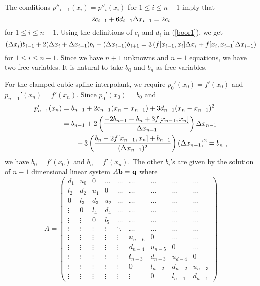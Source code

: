 The conditions $p''_{i-1}(x_i)= p''_i(x_i)$ for $1\leq i \leq n-1$
imply that
\[
2c_{i-1} + 6d_{i-1} \Delta{x_{i-1}} = 2 c_i
\]
for $1\leq i \leq n-1$.  Using the definitions of $c_i$ and $d_i$ in 
(\ref{boor1}), we get
\[
(\Delta{x_i}) b_{i-1}  + 2 (\Delta{x_i} + \Delta{x_{i-1}}) b_i
+ (\Delta{x_{i-1}}) b_{i+1} 
= 3 \left( f[x_{i-1},x_i] \Delta{x_i} + f[x_i,x_{i+1}] \Delta{x_{i-1}}
\right)
\]
for $1 \leq i \leq n-1$.  Since we have $n+1$ unknowns and $n-1$
equations, we have two free variables.  It is natural to take
$b_0$ and $b_n$ as free variables.

For the clamped cubic spline interpolant, we require
$p_0'(x_0) = f'(x_0)$ and $p_{n-1}'(x_n) = f'(x_n)$.  Since
$p_0'(x_0) = b_0$ and
\begin{align*}
p_{n-1}'(x_n) &= b_{n-1} + 2 c_{n-1} (x_n - x_{n-1})
+ 3 d_{n-1} ( x_n - x_{n-1})^2 \\
& = b_{n-1} +2
\left(\frac{-2b_{n-1} - b_n + 3f[x_{n-1},x_n]}{\Delta{x_{n-1}}}\right) 
\Delta{x_{n-1}} \\
&\qquad
+ 3 \left(\frac{b_n - 2 f[x_{n-1},x_n] + b_{n-1}}{(\Delta{x_{n-1}})^2}\right)
(\Delta{x_{n-1}})^2  = b_n \ ,
\end{align*}
we have $b_0 = f'(x_0)$ and $b_n = f'(x_n)$.  The
other $b_i$'s are given by the solution of $n-1$ dimensional linear system
$A \mathbf{b} = \mathbf{q}$ where
\[
A = \left( \begin{array}{ccccccccc}
d_1  & u_0 & 0 & \ldots & \ldots & \ldots & \ldots & \ldots & \ldots \\ 
l_2 & d_2  & u_1 & 0 & \ldots & \ldots & \ldots & \ldots & \ldots \\ 
0 & l_3 & d_3 & u_2 & \ldots & \ldots & \ldots & \ldots & \ldots \\ 
\vdots & 0 & l_4 & d_4 & \ldots & \ldots & \ldots & \ldots & \ldots \\ 
\vdots & \vdots & 0 & l_5 & \ldots & \ldots & \ldots & \ldots & \ldots \\ 
\vdots & \vdots & \vdots & \vdots & \ddots & \ldots & \ldots &
\ldots & \ldots \\ 
\vdots & \vdots & \vdots & \vdots & \vdots & u_{n-6} & 0 & \ldots & \ldots \\ 
\vdots & \vdots & \vdots & \vdots & \vdots & d_{n-4} &  u_{n-5} & 0 & \ldots \\ 
\vdots & \vdots & \vdots & \vdots & \vdots & l_{n-3} &  d_{n-3} & u_{d-4} & 0 \\ 
\vdots & \vdots & \vdots & \vdots & \vdots & 0 & l_{n-2} & d_{n-2} & u_{n-3} \\
\vdots & \vdots & \vdots & \vdots & \vdots & \vdots & 0 & l_{n-1} & d_{n-1} 
\end{array} \right)
\]
